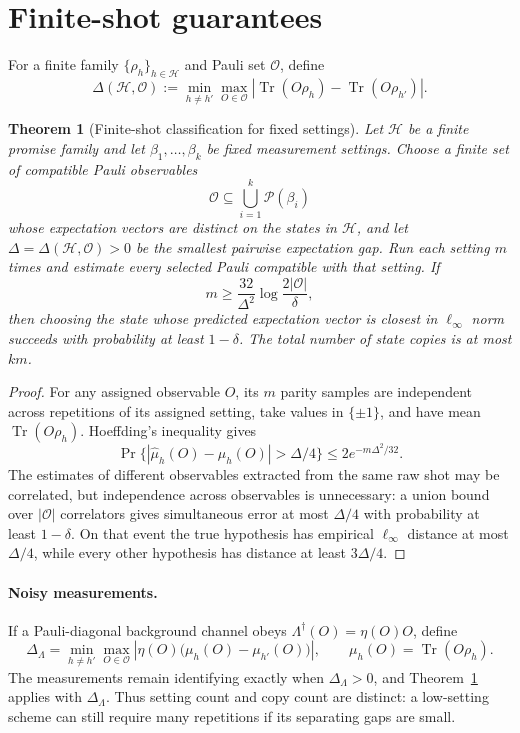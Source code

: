 \documentclass[11pt]{article}
\newtheorem{theorem}{Theorem}[section]
\theoremstyle{remark}
\newcommand{\Tr}{\operatorname{Tr}}
\newcommand{\cO}{\mathcal{O}}
\newcommand{\cH}{\mathcal{H}}
\begin{document}
\section{Finite-shot guarantees}\label{sec:finite}
For a finite family $\{\rho_h\}_{h\in\cH}$ and Pauli set $\cO$, define
\[
\Delta(\cH,\cO):=\min_{h\ne h'}\max_{O\in\cO}|\Tr(O\rho_h)-\Tr(O\rho_{h'})|.
\]

\begin{theorem}[Finite-shot classification for fixed settings]\label{thm:classifier}
Let \(\cH\) be a finite promise family and let \(\beta_1,\ldots,\beta_k\) be fixed measurement settings.  Choose a finite set of compatible Pauli observables
\[
\cO\subseteq\bigcup_{i=1}^k\mathcal P(\beta_i)
\]
whose expectation vectors are distinct on the states in \(\cH\), and let \(\Delta=\Delta(\cH,\cO)>0\) be the smallest pairwise expectation gap.  Run each setting \(m\) times and estimate every selected Pauli compatible with that setting.  If
\[
m\ge \frac{32}{\Delta^2}\log\frac{2|\cO|}{\delta},
\]
then choosing the state whose predicted expectation vector is closest in \(\ell_\infty\) norm succeeds with probability at least \(1-\delta\).  The total number of state copies is at most \(km\).
\end{theorem}

\begin{proof}
For any assigned observable $O$, its $m$ parity samples are independent across repetitions of its assigned setting, take values in $\{\pm1\}$, and have mean $\Tr(O\rho_h)$. Hoeffding's inequality gives
\[
\Pr\{|\widehat\mu_h(O)-\mu_h(O)|>\Delta/4\}
\le 2e^{-m\Delta^2/32}.
\]
The estimates of different observables extracted from the same raw shot may be correlated, but independence across observables is unnecessary: a union bound over $|\cO|$ correlators gives simultaneous error at most $\Delta/4$ with probability at least $1-\delta$. On that event the true hypothesis has empirical $\ell_\infty$ distance at most $\Delta/4$, while every other hypothesis has distance at least $3\Delta/4$.
\end{proof}

\paragraph{Noisy measurements.}
If a Pauli-diagonal background channel obeys $\Lambda^\dagger(O)=\eta(O)O$, define
\[
\Delta_\Lambda
=\min_{h\ne h'}\max_{O\in\cO}
\left|\eta(O)\big(\mu_h(O)-\mu_{h'}(O)\big)\right|,
\qquad \mu_h(O)=\Tr(O\rho_h).
\]
The measurements remain identifying exactly when $\Delta_\Lambda>0$, and Theorem~\ref{thm:classifier} applies with $\Delta_\Lambda$.  Thus setting count and copy count are distinct: a low-setting scheme can still require many repetitions if its separating gaps are small.
\end{document}
